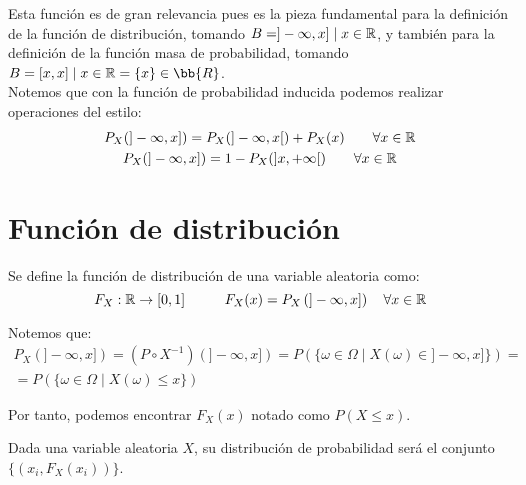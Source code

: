 Esta función es de gran relevancia pues es la pieza fundamental para la definición de la función de distribución, tomando $B=]-\infty, x] \mid x \in \mathbb R$, y también para la definición de la función masa de probabilidad, tomando $B=[x,x] \mid x \in \R = \{x\}\in \bb{R}$.\\

Notemos que con la función de probabilidad inducida podemos realizar operaciones del estilo:
\begin{gather*}
    P_X(]-\infty, x]) = P_X(]-\infty, x[) + P_X(x) \qquad \forall x \in \mathbb R\\
    P_X(]-\infty, x]) = 1 - P_X(]x, +\infty[) \qquad \forall x \in \mathbb R
\end{gather*}

\section{Función de distribución}
\begin{definicion}
Se define la función de distribución de una variable aleatoria como:
$$F_X:\mathbb R \rightarrow [0,1] \hspace{1cm}
F_X(x) = P_X\left(]-\infty,x]\right) \quad \forall x \in \mathbb R$$
\end{definicion}
\begin{notacion}
Notemos que:
\begin{multline*}
    P_X(]-\infty, x]) = (P \circ X^{-1})(]-\infty, x]) = P(\{\omega \in \Omega \mid X(\omega) \in ]-\infty, x] \}) =\\
    =P(\{\omega \in \Omega \mid X(\omega) \leq x\})
\end{multline*}

Por tanto, podemos encontrar $F_X(x)$ notado como $P(X \leq x)$.
\end{notacion}

\begin{definicion}
    Dada una variable aleatoria $X$, su distribución de probabilidad será el conjunto $\{(x_i, F_X(x_i))\}$.
\end{definicion}

